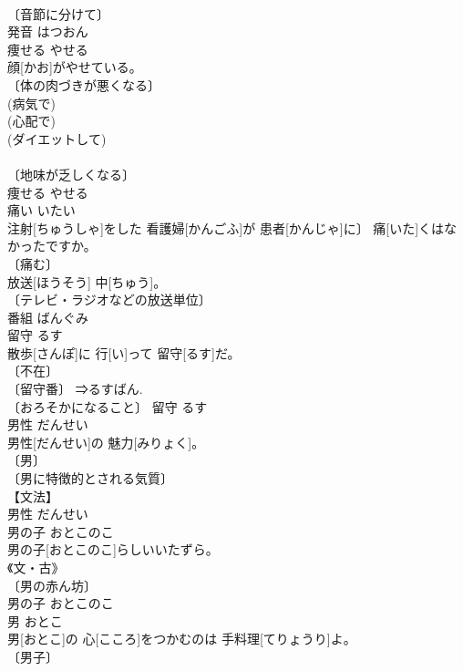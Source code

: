 \documentclass[8pt]{extreport}
\begin{document}
\begin{CJK}{UTF8}{min}
\\	〔音節に分けて〕 
\\	発音	はつおん	
\\	痩せる	やせる	
\\	顔[かお]がやせている。	
\\	〔体の肉づきが悪くなる〕 
\\	(病気で) 
\\	(心配で) 
\\	(ダイエットして) 
\\	[⇒やせた] 
\\	〔地味が乏しくなる〕 
\\	痩せる	やせる	
\\	痛い	いたい	
\\	注射[ちゅうしゃ]をした 看護婦[かんごふ]が 患者[かんじゃ]に〕 痛[いた]くはなかったですか。	
\\	〔痛む〕 
\\	[＝いたむ２ 
\\	〔つらい〕 
\\	〔困る〕 
\\	痛い	いたい	
\\	番組	ばんぐみ	
\\	番組[ばんぐみ] 放送[ほうそう] 中[ちゅう]。	
\\	〔テレビ・ラジオなどの放送単位〕 
\\	番組	ばんぐみ	
\\	留守	るす	
\\	散歩[さんぽ]に 行[い]って 留守[るす]だ。	
\\	〔不在〕 
\\	〔留守番〕 ⇒るすばん. 
\\	〔おろそかになること〕	留守	るす	
\\	男性	だんせい	
\\	男性[だんせい]の 魅力[みりょく]。	
\\	〔男〕 
\\	〔男に特徴的とされる気質〕 
\\	【文法】 
\\	男性	だんせい	
\\	男の子	おとこのこ	
\\	男の子[おとこのこ]らしいいたずら。	
\\	《文・古》 
\\	〔男の赤ん坊〕 
\\	男の子	おとこのこ	
\\	男	おとこ	
\\	男[おとこ]の 心[こころ]をつかむのは 手料理[てりょうり]よ。	
\\	〔男子〕 

\end{CJK}
\end{document}
